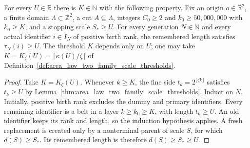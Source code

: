 
\begin{lemma}
    \label{thm:area_law_repair_positive_rank_length_lower_bound}
    \leanok
    For every $U\in\mathbb R$ there is $K\in\mathbb N$ with the
    following property. Fix an origin $o\in\mathbb R^2$, a finite
    domain $\Lambda\subset\mathbb Z^2$, a cut $A\subseteq\Lambda$,
    integers $C_0\ge2$ and $k_0\ge50{,}000{,}000$ with $k_0\ge K$,
    and a stopping scale $S_*\ge U$. For every generation
    $N\in\mathbb N$ and every actual identifier $i\in I_N$ of
    positive birth rank, the remembered length satisfies
    $\tau_N(i)\ge U$. The threshold $K$ depends only on $U$; one may take
    $K=K_\zeta(U)=\lceil\kappa(U)/\zeta\rceil$ of
    Definition~\ref{def:area_law_two_family_scale_thresholds}.
\end{lemma}

\begin{proof}
    \leanok
    Take $K=K_\zeta(U)$. Whenever $k\ge K$, the fine side
    $t_k=2^{\lfloor\zeta k\rfloor}$ satisfies $t_k\ge U$ by
    Lemma~\ref{thm:area_law_two_family_scale_thresholds}.
    Induct on $N$. Initially, positive birth rank excludes the dummy
    and primary identifiers. Every remaining identifier is a belt
    in a layer $k\ge k_0\ge K$, with length $t_k\ge U$.
    An old identifier keeps its rank and length, so the induction
    hypothesis applies. A fresh replacement is created only by a
    nonterminal parent of scale $S$, for which $d(S)\ge S_*$.
    Its remembered length is therefore $d(S)\ge S_*\ge U$.
\end{proof}

